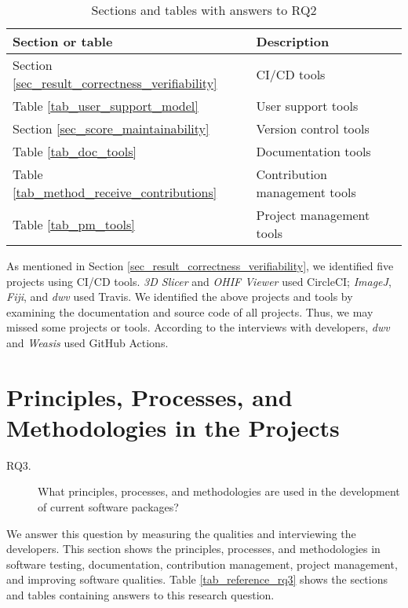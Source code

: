 \begin{table}[H]
\centering
\begin{tabular}{ll}
\hline
Section or table & Description \\ \hline
Section \ref{sec_result_correctness_verifiability} & CI/CD tools \\
Table \ref{tab_user_support_model} & User support tools \\
Section \ref{sec_score_maintainability} & Version control tools \\
Table \ref{tab_doc_tools} & Documentation tools \\
Table \ref{tab_method_receive_contributions} & Contribution management tools \\
Table \ref{tab_pm_tools} & Project management tools\\ \hline
\end{tabular}
\caption{\label{tab_reference_rq2}Sections and tables with answers to RQ2}
\end{table}

As mentioned in Section \ref{sec_result_correctness_verifiability}, we identified five projects using CI/CD tools. \textit{3D Slicer} and \textit{OHIF Viewer} used CircleCI; \textit{ImageJ}, \textit{Fiji}, and \textit{dwv} used Travis. We identified the above projects and tools by examining the documentation and source code of all projects. Thus, we may missed some projects or tools. According to the interviews with developers, \textit{dwv} and \textit{Weasis} used GitHub Actions.

\section{Principles, Processes, and Methodologies in the Projects}
\label{sec_rq_PPM}
\begin{description}
\item[RQ3.] What principles, processes, and methodologies are used in the development of current software packages?
\end{description}

We answer this question by measuring the qualities and interviewing the developers. This section shows the principles, processes, and methodologies in software testing, documentation, contribution management, project management, and improving software qualities. Table \ref{tab_reference_rq3} shows the sections and tables containing answers to this research question.

